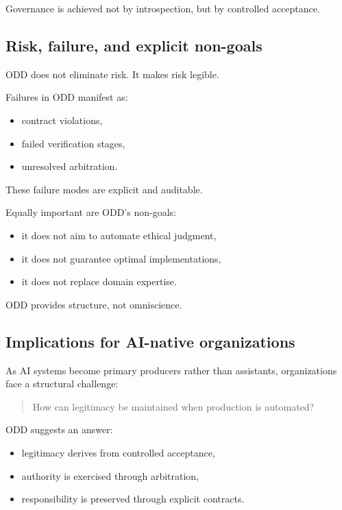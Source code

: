 \documentclass[conference]{IEEEtran}
\begin{document}
Governance is achieved not by introspection, but by controlled acceptance.

\subsection{Risk, failure, and explicit non-goals}
ODD does not eliminate risk. It makes risk legible.

Failures in ODD manifest as:
\begin{itemize}
\item contract violations,
\item failed verification stages,
\item unresolved arbitration.
\end{itemize}

These failure modes are explicit and auditable.

Equally important are ODD's non-goals:
\begin{itemize}
\item it does not aim to automate ethical judgment,
\item it does not guarantee optimal implementations,
\item it does not replace domain expertise.
\end{itemize}

ODD provides structure, not omniscience.

\subsection{Implications for AI-native organizations}
As AI systems become primary producers rather than assistants, organizations face a structural challenge:
\begin{quote}
How can legitimacy be maintained when production is automated?
\end{quote}

ODD suggests an answer:
\begin{itemize}
\item legitimacy derives from controlled acceptance,
\item authority is exercised through arbitration,
\item responsibility is preserved through explicit contracts.
\end{itemize}
\end{document}
